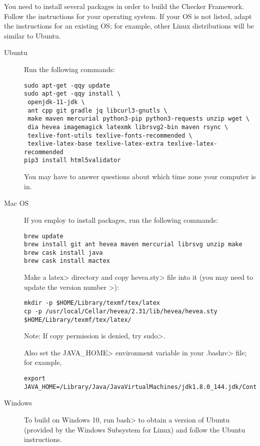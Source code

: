You need to install several packages in order to build the Checker
Framework.
Follow the instructions for your operating system.
If your OS is not listed, adapt the instructions for an existing OS;
for example, other Linux distributions will be similar to Ubuntu.

\begin{description}
\item[Ubuntu]
  Run the following commands:

\begin{Verbatim}
sudo apt-get -qqy update
sudo apt-get -qqy install \
 openjdk-11-jdk \
 ant cpp git gradle jq libcurl3-gnutls \
 make maven mercurial python3-pip python3-requests unzip wget \
 dia hevea imagemagick latexmk librsvg2-bin maven rsync \
 texlive-font-utils texlive-fonts-recommended \
 texlive-latex-base texlive-latex-extra texlive-latex-recommended
pip3 install html5validator
\end{Verbatim}

  You may have to answer questions about which time zone your computer is in.

\item[Mac OS]
  If you employ  to install packages, run
  the following commands:

\begin{Verbatim}
brew update
brew install git ant hevea maven mercurial librsvg unzip make
brew cask install java
brew cask install mactex
\end{Verbatim}

Make a \<latex> directory and copy \<hevea.sty> file into it (you may need to update the version number >):

\begin{Verbatim}
mkdir -p $HOME/Library/texmf/tex/latex
cp -p /usr/local/Cellar/hevea/2.31/lib/hevea/hevea.sty $HOME/Library/texmf/tex/latex/
\end{Verbatim}

Note: If copy permission is denied, try \<sudo>.

Also set the \<JAVA\_HOME> environment variable in your \<.bashrc> file;
for example,

\begin{Verbatim}
export JAVA_HOME=/Library/Java/JavaVirtualMachines/jdk1.8.0_144.jdk/Contents/Home
\end{Verbatim}


\item[Windows]
  To build on Windows 10,
  run \<bash> to obtain a version of
  Ubuntu (provided by the Windows Subsystem for Linux) and follow the Ubuntu
  instructions.


\end{description}


